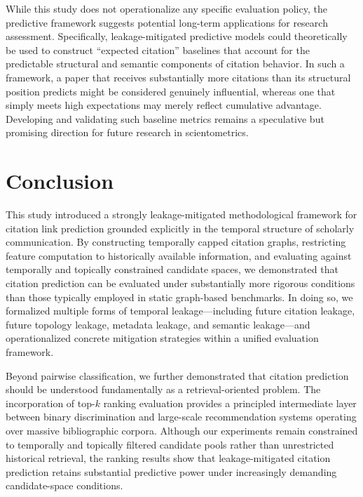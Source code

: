 \documentclass[11pt,a4paper]{article}
\begin{document}
While this study does not operationalize any specific evaluation policy, the predictive framework suggests potential long-term applications for research assessment. Specifically, leakage-mitigated predictive models could theoretically be used to construct ``expected citation'' baselines that account for the predictable structural and semantic components of citation behavior. In such a framework, a paper that receives substantially more citations than its structural position predicts might be considered genuinely influential, whereas one that simply meets high expectations may merely reflect cumulative advantage. Developing and validating such baseline metrics remains a speculative but promising direction for future research in scientometrics.

\section{Conclusion}
\label{sec:conclusion}

This study introduced a strongly leakage-mitigated methodological framework for citation link prediction grounded explicitly in the temporal structure of scholarly communication. By constructing temporally capped citation graphs, restricting feature computation to historically available information, and evaluating against temporally and topically constrained candidate spaces, we demonstrated that citation prediction can be evaluated under substantially more rigorous conditions than those typically employed in static graph-based benchmarks. In doing so, we formalized multiple forms of temporal leakage---including future citation leakage, future topology leakage, metadata leakage, and semantic leakage---and operationalized concrete mitigation strategies within a unified evaluation framework.

Beyond pairwise classification, we further demonstrated that citation prediction should be understood fundamentally as a retrieval-oriented problem. The incorporation of top-\(k\) ranking evaluation provides a principled intermediate layer between binary discrimination and large-scale recommendation systems operating over massive bibliographic corpora. Although our experiments remain constrained to temporally and topically filtered candidate pools rather than unrestricted historical retrieval, the ranking results show that leakage-mitigated citation prediction retains substantial predictive power under increasingly demanding candidate-space conditions.
\end{document}
